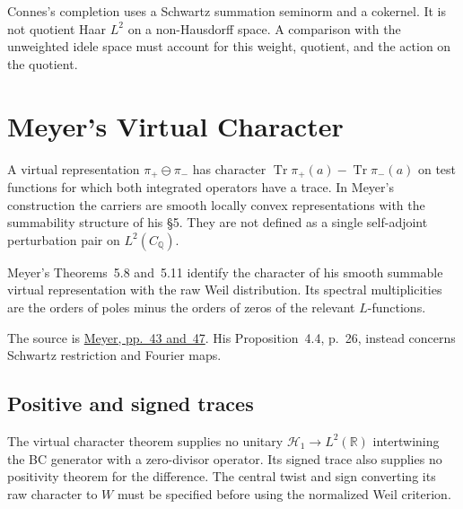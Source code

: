 \begin{remark}
\label{v4-arith:w9-r4:rem:adele-transfers}
Connes's completion uses a Schwartz summation seminorm and a
cokernel. It is not quotient Haar \(L^2\) on a non-Hausdorff space.
A comparison with the unweighted idele space must account for
this weight, quotient, and the action on the quotient.
\end{remark}

\section{Meyer's Virtual Character}
\label{v4-arith:w9-r4:meyer-2005}
\label{v4-arith:w9-r4:meyer-2005:construction}
\begin{definition}
\label{v4-arith:w9-r4:def:meyer-data}
A virtual representation \(\pi_+\ominus\pi_-\) has character
\(\operatorname{Tr}\pi_+(a)-\operatorname{Tr}\pi_-(a)\)
on test functions for which both integrated operators have a trace.
In Meyer's construction the carriers are smooth locally convex
representations with the summability structure of his \S5.
They are not defined as a single self-adjoint perturbation pair
on \(L^2(C_{\mathbb Q})\).
\end{definition}

\begin{theorem}
\label{v4-arith:w9-r4:thm:meyer-intertwiner}
Meyer's Theorems~5.8 and~5.11 identify the character of his smooth
summable virtual representation with the raw Weil distribution.
Its spectral multiplicities are the orders of poles minus the
orders of zeros of the relevant \(L\)-functions.
\end{theorem}
The source is \href{https://arxiv.org/pdf/math/0311468}{Meyer,
pp.~43 and~47}. His Proposition~4.4, p.~26, instead concerns
Schwartz restriction and Fourier maps.

\subsection{Positive and signed traces}
\label{v4-arith:w9-r4:meyer-2005:limitation}
\begin{remark}
\label{v4-arith:w9-r4:rem:meyer-not-A}
The virtual character theorem supplies no unitary
\(\mathcal H_1\to L^2(\mathbb R)\) intertwining the BC generator
with a zero-divisor operator. Its signed trace also supplies no
positivity theorem for the difference. The central twist and
sign converting its raw character to \(W\) must be specified
before using the normalized Weil criterion.
\end{remark}

